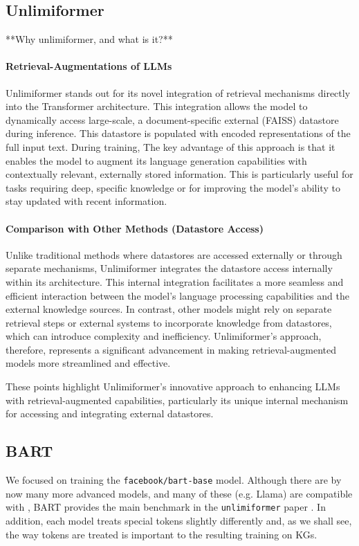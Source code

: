\documentclass[12pt]{article}
\begin{document}
\subsection*{Unlimiformer}
**Why unlimiformer, and what is it?**

\paragraph{Retrieval-Augmentations of LLMs} Unlimiformer stands out for its novel
integration of retrieval mechanisms directly into the Transformer architecture.
This integration allows the model to dynamically access large-scale, a
document-specific external
(FAISS) datastore during inference. This datastore is populated with
encoded representations of the full input text. During training,  The key advantage of this
approach is that it enables the model to augment its language generation
capabilities with contextually relevant, externally stored information. This is
particularly useful for tasks requiring deep, specific knowledge or for
improving the model's ability to stay updated with recent information.

\paragraph{Comparison with Other Methods (Datastore Access)} Unlike traditional
methods where datastores are accessed externally or through separate
mechanisms, Unlimiformer integrates the datastore access internally within its
architecture. This internal integration facilitates a more seamless and
efficient interaction between the model's language processing capabilities and
the external knowledge sources. In contrast, other models might rely on
separate retrieval steps or external systems to incorporate knowledge from
datastores, which can introduce complexity and inefficiency. Unlimiformer's
approach, therefore, represents a significant advancement in making
retrieval-augmented models more streamlined and effective.

These points highlight Unlimiformer's innovative approach to enhancing LLMs with retrieval-augmented capabilities, particularly its unique internal mechanism for accessing and integrating external datastores.

\subsection*{BART} We focused on training the \texttt{facebook/bart-base}
model. Although there are by now many more advanced models, and many of these
(e.g. Llama) are compatible with , BART provides the main
benchmark in the \texttt{unlimiformer} paper \cite{bertsch2023unlimiformer}.
In addition, each model treats special tokens slightly differently and, as we
shall see, the way tokens are treated is important to the resulting training on
KGs.
\end{document}
